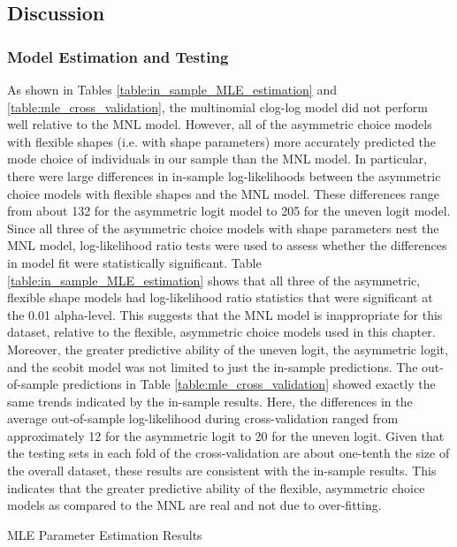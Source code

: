 \subsection{Discussion}
\label{sec:application_discussion}

\subsubsection{Model Estimation and Testing}
As shown in Tables \ref{table:in_sample_MLE_estimation} and \ref{table:mle_cross_validation}, the multinomial clog-log model did not perform well relative to the MNL model. However, all of the asymmetric choice models with flexible shapes (i.e. with shape parameters) more accurately predicted the mode choice of individuals in our sample than the MNL model. In particular, there were large differences in in-sample log-likelihoods between the asymmetric choice models with flexible shapes and the MNL model. These differences range from about 132 for the asymmetric logit model to 205 for the uneven logit model. Since all three of the asymmetric choice models with shape parameters nest the MNL model, log-likelihood ratio tests were used to assess whether the differences in model fit were statistically significant. Table \ref{table:in_sample_MLE_estimation} shows that all three of the asymmetric, flexible shape models had log-likelihood ratio statistics that were significant at the 0.01 alpha-level. This suggests that the MNL model is inappropriate for this dataset, relative to the flexible, asymmetric choice models used in this chapter. Moreover, the greater predictive ability of the uneven logit, the asymmetric logit, and the scobit model was not limited to just the in-sample predictions. The out-of-sample predictions in Table \ref{table:mle_cross_validation} showed exactly the same trends indicated by the in-sample results. Here, the differences in the average out-of-sample log-likelihood during cross-validation ranged from approximately 12 for the asymmetric logit to 20 for the uneven logit. Given that the testing sets in each fold of the cross-validation are about one-tenth the size of the overall dataset, these results are consistent with the in-sample results. This indicates that the greater predictive ability of the flexible, asymmetric choice models as compared to the MNL are real and not due to over-fitting.

\begin{landscape}
\begin{table}
\centering

\caption{MLE Parameter Estimation Results}
\label{table:in_sample_MLE_estimation}



\end{table}
\end{landscape}

